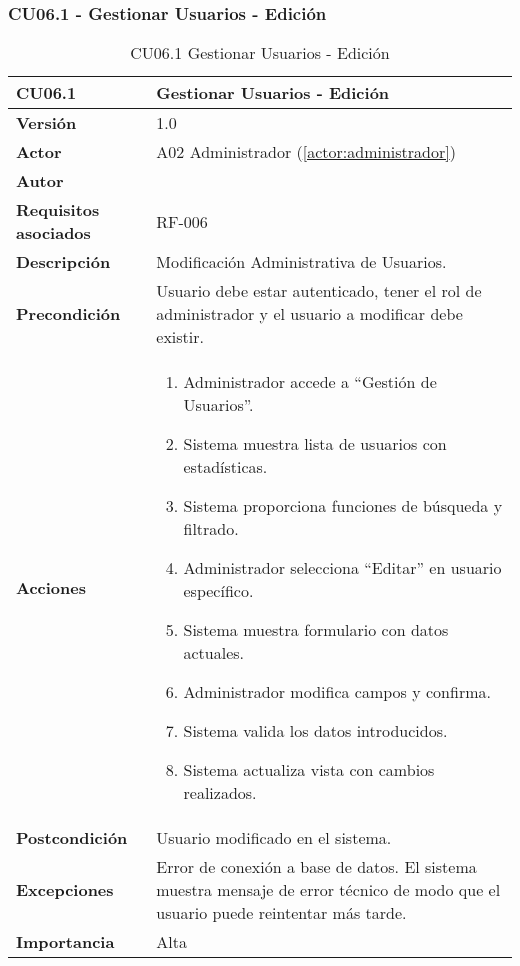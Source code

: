 \subsubsection{CU06.1 - Gestionar Usuarios - Edición}

\begin{table}[H]
	\centering
	\begin{tabularx}{\linewidth}{ p{} p{} }
		\toprule
		\textbf{CU06.1}    & \textbf{Gestionar Usuarios - Edición} \\
		\toprule
		\textbf{Versión}              & 1.0    \\
		\textbf{Actor}                & A02 Administrador (\ref{actor:administrador}) \\
		\textbf{Autor}                & \nombre \\
		\textbf{Requisitos asociados} & RF-006 \\
		\textbf{Descripción}          & Modificación Administrativa de Usuarios. \\
		\textbf{Precondición}         & Usuario debe estar autenticado, tener el rol de administrador y el usuario a modificar debe existir. \\
		\textbf{Acciones}             &
		\begin{enumerate}
			\def\labelenumi{\arabic{enumi}.}
			\tightlist
			\item Administrador accede a ``Gestión de Usuarios''.
            \item Sistema muestra lista de usuarios con estadísticas.
            \item Sistema proporciona funciones de búsqueda y filtrado.
            \item Administrador selecciona ``Editar'' en usuario específico.
 	    \item Sistema muestra formulario con datos actuales.
            \item Administrador modifica campos y confirma.
            \item Sistema valida los datos introducidos.
            \item Sistema actualiza vista con cambios realizados.
		\end{enumerate}\\
		\textbf{Postcondición}        & Usuario modificado en el sistema.\\
		\textbf{Excepciones}          & Error de conexión a base de datos. El sistema muestra mensaje de error técnico de modo que el usuario puede reintentar más tarde.\\
		\textbf{Importancia}          & Alta \\
		\bottomrule
	\end{tabularx}
	\caption{CU06.1 Gestionar Usuarios - Edición}
	\label{cu:gestionar-usuarios-edicion}
\end{table}

